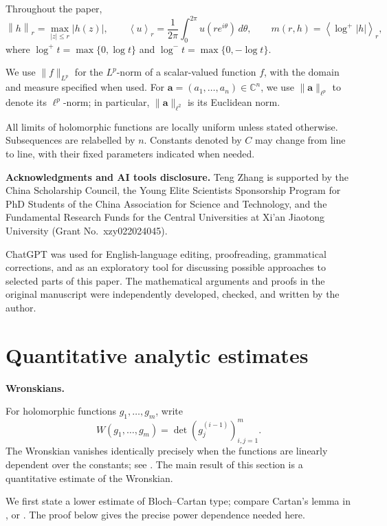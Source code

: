 \documentclass[12pt,letterpaper,reqno]{amsart}
\theoremstyle{definition}
\numberwithin{equation}{section}
\newcommand{\C}{\mathbb C}
\newcommand{\dd}{\,d}
\newcommand{\norm}[2]{\left\lVert #1\right\rVert_{#2}}
\newcommand{\mean}[2]{\left\langle #1\right\rangle_{#2}}
\begin{document}
	Throughout the paper,
	\[
	\norm{h}{r}=\max_{|z|\le r}|h(z)|,\qquad
	\mean{u}{r}=\frac1{2\pi}\int_0^{2\pi}u(re^{i\theta})\dd\theta,
	\qquad m(r,h)=\mean{\log^+|h|}{r},
	\]
	where $\log^+t=\max\{0,\log t\}$ and
	$\log^-t=\max\{0,-\log t\}$.
	
	We use $\|f\|_{L^p}$ for the $L^p$-norm of a scalar-valued function
	$f$, with the domain and measure specified when used. For $\bm{a}=(a_1,\ldots,a_n)\in\C^n$, we use
	$\|\bm{a}\|_{\ell^p}$ to denote its $\ell^p$-norm; in particular,
	$\|\bm{a}\|_{\ell^2}$ is its Euclidean norm.
	
	All limits of holomorphic functions are
	locally uniform unless stated otherwise. Subsequences are relabelled
	by $n$. Constants denoted by $C$ may change from line to line, with
	their fixed parameters indicated when needed.

    \medskip
\noindent\textbf{Acknowledgments and AI tools disclosure. } Teng Zhang is supported by the China Scholarship Council, the Young Elite Scientists Sponsorship Program for PhD Students of the China Association for Science and Technology, and the Fundamental Research Funds for the Central Universities at Xi'an Jiaotong University (Grant No.~xzy022024045).

ChatGPT was used for English-language editing, proofreading, grammatical corrections, and as an exploratory tool for discussing possible approaches to selected parts of this paper. The mathematical arguments and proofs in the original manuscript were independently developed, checked, and written by the author.
	
	\section{Quantitative analytic estimates}\label{sec:wronskian}
	
	\medskip\noindent\textbf{Wronskians.}
	
	For holomorphic functions $g_1,\ldots,g_m$, write
	\[
	W(g_1,\ldots,g_m)=\det(g_j^{(i-1)})_{i,j=1}^m.
	\]
	The Wronskian vanishes identically precisely when the functions are
	linearly dependent over the constants; see \cite[Theorem~1]{BD10}.
	The main result of this section is a quantitative estimate of the
	Wronskian.
	
	We first state a lower estimate of
	Bloch--Cartan type; compare Cartan's lemma in
	\cite[Th\'eor\`eme~III, pp.~273--276]{Car28}, or \cite[Chap. VIII, \S3]{Lan87}.
	The proof below gives the precise power dependence needed here.
	
\end{document}
